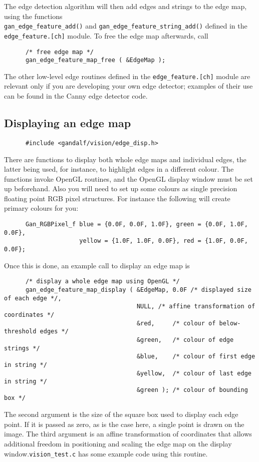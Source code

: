 The edge detection algorithm will then add edges and strings to the edge map,
using the functions\\ {\tt gan\_edge\_feature\_add()} and
{\tt gan\_edge\_feature\_string\_add()} defined in the {\tt edge\_feature.[ch]}
module. To free the edge map afterwards, call
\begin{verbatim}
      /* free edge map */
      gan_edge_feature_map_free ( &EdgeMap );
\end{verbatim}
The other low-level edge routines defined
in the {\tt edge\_feature.[ch]} module are
relevant only if you are developing your own edge detector; examples
of their use can be found in the Canny edge detector code.

\subsection{Displaying an edge map}\label{edge-disp-sec}
\begin{verbatim}
      #include <gandalf/vision/edge_disp.h>
\end{verbatim}
There are functions to display both whole edge maps and individual edges,
the latter being used, for instance, to highlight edges in a different colour.
The functions invoke OpenGL routines, and the OpenGL display window must be
set up beforehand. Also you will need to set up some colours as single
precision floating point RGB pixel structures.
For instance the following will create primary colours for you:
\begin{verbatim}
      Gan_RGBPixel_f blue = {0.0F, 0.0F, 1.0F}, green = {0.0F, 1.0F, 0.0F},
                     yellow = {1.0F, 1.0F, 0.0F}, red = {1.0F, 0.0F, 0.0F};
\end{verbatim}
Once this is done, an example call to display an edge map is
\begin{verbatim}
      /* display a whole edge map using OpenGL */
      gan_edge_feature_map_display ( &EdgeMap, 0.0F /* displayed size of each edge */,
                                     NULL, /* affine transformation of coordinates */
                                     &red,     /* colour of below-threshold edges */
                                     &green,   /* colour of edge strings */
                                     &blue,    /* colour of first edge in string */
                                     &yellow,  /* colour of last edge in string */
                                     &green ); /* colour of bounding box */
\end{verbatim}
The second argument is the size of the square box used to display each
edge point. If it is passed as zero, as is the case here, a single point is
drawn on the image. The third argument is an affine transformation
of coordinates that allows additional freedom in positioning and scaling
the edge map on the display window.{\tt vision\_test.c} has some example code
using this routine.

